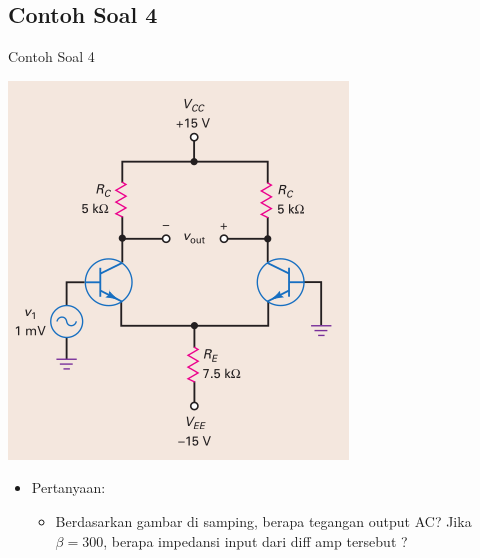 \documentclass[aspectratio=169]{beamer}
\begin{document}
\subsection{Contoh Soal 4}
\begin{frame}{Contoh Soal 4}
	\begin{multicols}{2}
		\begin{center}
			\includegraphics[height=0.7\textheight]{gambar/01.contoh_soal_1-2}
		\end{center}
		\columnbreak
		\begin{itemize}
			\item Pertanyaan:
			\begin{itemize}
				\item Berdasarkan gambar di samping, berapa tegangan output AC? Jika $ \beta = 300 $, berapa impedansi input dari diff amp tersebut ?
			\end{itemize}
		\end{itemize}
	\end{multicols}
\end{frame}
\end{document}
